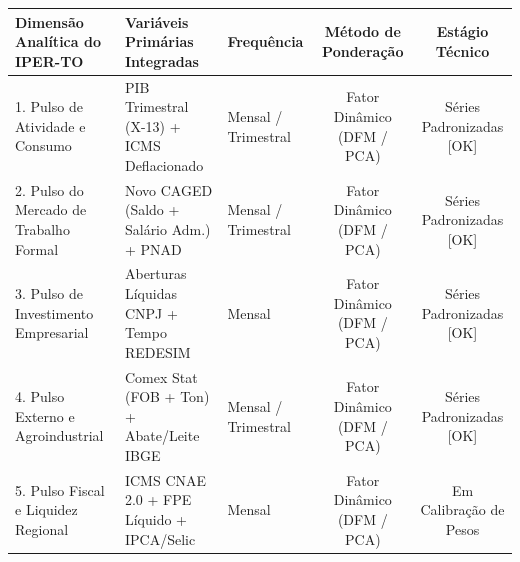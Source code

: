\documentclass[10pt,a4paper]{article}
\begin{document}
\noindent\begin{minipage}{\linewidth}
  \par\vspace{2pt}
  {\fontsize{7.0}{8.6}\selectfont\setlength{\tabcolsep}{4.5pt}%
\begin{tabularx}{\linewidth}{ll>{\raggedright\arraybackslash}Xcc}
\toprule
\rowcolor{corprimaria} \textbf{\color{white}Dimensão Analítica do IPER-TO} & \textbf{\color{white}Variáveis Primárias Integradas} & \textbf{\color{white}Frequência} & \textbf{\color{white}Método de Ponderação} & \textbf{\color{white}Estágio Técnico} \\
\midrule
1. Pulso de Atividade e Consumo & PIB Trimestral (X-13) + ICMS Deflacionado & Mensal / Trimestral & Fator Dinâmico (DFM / PCA) & Séries Padronizadas [OK] \\
\rowcolor{corfundo} 2. Pulso do Mercado de Trabalho Formal & Novo CAGED (Saldo + Salário Adm.) + PNAD & Mensal / Trimestral & Fator Dinâmico (DFM / PCA) & Séries Padronizadas [OK] \\
3. Pulso de Investimento Empresarial & Aberturas Líquidas CNPJ + Tempo REDESIM & Mensal & Fator Dinâmico (DFM / PCA) & Séries Padronizadas [OK] \\
\rowcolor{corfundo} 4. Pulso Externo e Agroindustrial & Comex Stat (FOB + Ton) + Abate/Leite IBGE & Mensal / Trimestral & Fator Dinâmico (DFM / PCA) & Séries Padronizadas [OK] \\
5. Pulso Fiscal e Liquidez Regional & ICMS CNAE 2.0 + FPE Líquido + IPCA/Selic & Mensal & Fator Dinâmico (DFM / PCA) & Em Calibração de Pesos \\
\bottomrule
\end{tabularx}%
}
  \par{}
\end{minipage}
\par\vspace{0.08cm}
\end{document}
